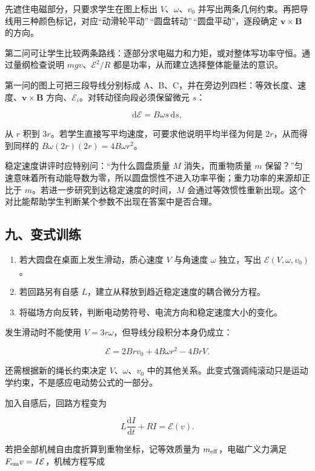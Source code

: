 \documentclass[12pt,a4paper,UTF8]{ctexart}
\newcommand{\tightlist}{\setlength{\itemsep}{0pt}\setlength{\parskip}{0pt}}
\begin{document}
先遮住电磁部分，只要求学生在图上标出 \(V\)、\(\omega\)、\(v_0\)
并写出两条几何约束。再把导线用三种颜色标记，对应``动滑轮平动''\,``圆盘转动''\,``圆盘平动''，逐段确定
\(\bm v\times\bm B\) 的方向。

第二问可让学生比较两条路线：逐部分求电磁力和力矩，或对整体写功率守恒。通过量纲检查说明
\(mgv\)、\(\mathcal E^2/R\) 都是功率，从而建立选择整体能量法的意识。

第一问的图上可把三段导线分别标成
A、B、C，并在旁边列四栏：等效长度、速度、\(\bm v\times\bm B\)
方向、\(\mathcal E_i\)。对转动径向段必须保留微元 \(s\)：

\[\mathrm d\mathcal E=B\omega s\,\mathrm ds,\]

从 \(r\) 积到 \(3r\)。若学生直接写平均速度，可要求他说明平均半径为何是
\(2r\)，从而得到同样的 \(B\omega(2r)(2r)=4B\omega r^2\)。

稳定速度讲评时应特别问：``为什么圆盘质量 \(M\) 消失，而重物质量 \(m\)
保留？''匀速意味着所有动能导数为零，所以圆盘惯性不进入功率平衡；重力功率的来源却正比于
\(m\)。若进一步研究到达稳定速度的时间，\(M\)
会通过等效惯性重新出现。这个对比能帮助学生判断某个参数不出现在答案中是否合理。

\subsection{九、变式训练}\label{ux4e5dux53d8ux5f0fux8badux7ec3-4}

\begin{enumerate}
\def\labelenumi{\arabic{enumi}.}
\tightlist
\item
  若大圆盘在桌面上发生滑动，质心速度 \(V\) 与角速度 \(\omega\)
  独立，写出 \(\mathcal E(V,\omega,v_0)\)。
\item
  若回路另有自感 \(L\)，建立从释放到趋近稳定速度的耦合微分方程。
\item
  将磁场方向反转，判断电动势符号、电流方向和稳定速度大小的变化。
\end{enumerate}

发生滑动时不能使用 \(V=3r\omega\)，但导线分段积分本身仍成立：

\[\mathcal E=2Brv_0+4B\omega r^2-4BrV.\]

还需根据新的绳长约束决定 \(V\)、\(\omega\)、\(v_0\)
中的其他关系。此变式强调纯滚动只是运动学约束，不是感应电动势公式的一部分。

加入自感后，回路方程变为

\[L\frac{\mathrm dI}{\mathrm dt}+RI=\mathcal E(v).\]

若把全部机械自由度折算到重物坐标，记等效质量为
\(m_{\rm eff}\)，电磁广义力满足
\(F_{\rm em}v=I\mathcal E\)，机械方程写成
\end{document}
